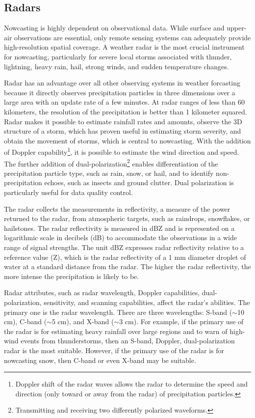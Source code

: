 \subsection{Radars}
\label{subsec:radars}

Nowcasting is highly dependent on observational data. While surface and upper-air observations are essential, only remote sensing systems can adequately provide high-resolution spatial coverage. A weather radar is the most crucial instrument for nowcasting, particularly for severe local storms associated with thunder, lightning, heavy rain, hail, strong winds, and sudden temperature changes.

Radar has an advantage over all other observing systems in weather forcasting because it directly observes precipitation particles in three dimensions over a large area with an update rate of a few minutes. At radar ranges of less than 60 kilometers, the resolution of the precipitation is better than 1 kilometer squared. Radar makes it possible to estimate rainfall rates and amounts, observe the 3D structure of a storm, which has proven useful in estimating storm severity, and obtain the movement of storms, which is central to nowcasting. With the addition of Doppler capability\footnote{Doppler shift of the radar waves allows the radar to determine the speed and direction (only toward or away from the radar) of precipitation particles.}, it is possible to estimate the wind direction and speed. The further addition of dual-polarization\footnote{Transmitting and receiving two differently polarized waveforms.} enables differentiation of the precipitation particle type, such as rain, snow, or hail, and to identify non-precipitation echoes, such as insects and ground clutter. Dual polarization is particularly useful for data quality control. \cite{nowcastingguidlines}

The radar collects the measurements in reflectivity, a measure of the power returned to the radar, from atmospheric targets, such as raindrops, snow\-flakes, or hailstones. The radar reflectivity is measured in dBZ and is represented on a logarithmic scale in decibels (dB) to accommodate the observations in a wide range of signal strengths. The unit dBZ expresses radar reflectivity relative to a reference value (Z), which is the radar reflectivity of a 1 mm diameter droplet of water at a standard distance from the radar. The higher the radar reflectivity, the more intense the precipitation is likely to be.

Radar attributes, such as radar wavelength, Doppler capabilities, dual-polarization, sensitivity, and scanning capabilities, affect the radar's abilities. The primary one is the radar wavelength. There are three wavelengths: S-band ($\sim$10 cm), C-band ($\sim$5 cm), and X-band ($\sim$3 cm). For example, if the primary use of the radar is for estimating heavy rainfall over large regions and to warn of high-wind events from thunderstorms, then an S-band, Doppler, dual-polarization radar is the most suitable. However, if the primary use of the radar is for nowcasting snow, then C-band or even X-band may be suitable. \cite{nowcastingguidlines}

